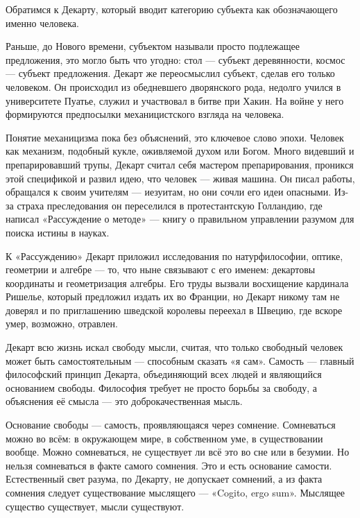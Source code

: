 
Обратимся к Декарту, который вводит категорию субъекта как обозначающего именно человека.

Раньше, до Нового времени, субъектом называли просто подлежащее предложения, это могло быть что угодно: стол --- субъект деревянности, космос --- субъект предложения. Декарт же переосмыслил субъект, сделав его только человеком. Он происходил из обедневшего дворянского рода, недолго учился в университете Пуатье, служил и участвовал в битве при Хакин. На войне у него формируются предпосылки механицистского взгляда на человека.

Понятие механицизма пока без объяснений, это ключевое слово эпохи. Человек как механизм, подобный кукле, оживляемой духом или Богом. Много видевший и препарировавший трупы, Декарт считал себя мастером препарирования, проникся этой спецификой и развил идею, что человек --- живая машина. Он писал работы, обращался к своим учителям --- иезуитам, но они сочли его идеи опасными. Из-за страха преследования он переселился в протестантскую Голландию, где написал «Рассуждение о методе» --- книгу о правильном управлении разумом для поиска истины в науках.

К «Рассуждению» Декарт приложил исследования по натурфилософии, оптике, геометрии и алгебре --- то, что ныне связывают с его именем: декартовы координаты и геометризация алгебры. Его труды вызвали восхищение кардинала Ришелье, который предложил издать их во Франции, но Декарт никому там не доверял и по приглашению шведской королевы переехал в Швецию, где вскоре умер, возможно, отравлен.

Декарт всю жизнь искал свободу мысли, считая, что только свободный человек может быть самостоятельным --- способным сказать «я сам». Самость --- главный философский принцип Декарта, объединяющий всех людей и являющийся основанием свободы. Философия требует не просто борьбы за свободу, а объяснения её смысла --- это доброкачественная мысль.

Основание свободы --- самость, проявляющаяся через сомнение. Сомневаться можно во всём: в окружающем мире, в собственном уме, в существовании вообще. Можно сомневаться, не существует ли всё это во сне или в безумии. Но нельзя сомневаться в факте самого сомнения. Это и есть основание самости. Естественный свет разума, по Декарту, не допускает сомнений, а из факта сомнения следует существование мыслящего --- «Cogito, ergo sum». Мыслящее существо существует, мысли существуют.

